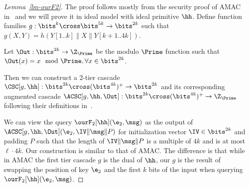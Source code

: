 \begin{proof}[Lemma~\ref{lm-ourF2}]
	The proof follows mostly from the security proof of AMAC in~\cite{EC:BelBerTes16} and we will prove it in ideal model with ideal primitive $\hh$. Define function families $g: \bits^{k} \cross\bits^{5k}\to\bits^{2k}$ such that $g(X,Y) = h(Y[1..k]\| X\|Y[k+1..4k])$.
	
	Let $\Out: \bits^{2k} \to \Z_{\Prime}$ be the modulo $\Prime$ function such that $\Out(x) = x \mod \Prime, \forall x \in \bits^{2k}$.
	
	Then we can construct a  2-tier cascade $\CSC[g, \hh]: \bits^{2k}\cross(\bits^{4k})^{+} \to \bits^{2k}$ and its corresponding augmented cascade $\ACSC[g, \hh, \Out]: \bits^{2k}\cross(\bits^{4k})^{+} \to \Z_\Prime$ following their definitions in~\cite{EC:BelBerTes16}.
	
	
	We can view the query $\ourF_2[\hh](\e_2, \msg)$ as the output of $\ACSC[g, \hh, \Out](\e_2, \IV\|\msg\|P)$ for initialization vector $\IV \in \bits^{2k}$ and padding $P$ such that the length of $\IV\|\msg\|P$ is a multiple of $4k$ and is at most $\ell \cdot 4k$.
	Our construction is similar to that of AMAC.  The difference is that while in AMAC the first tier cascade $g$ is the dual of $\hh$, our $g$ is the result of swapping the position of key $\e_2$ and the first $k$ bits of the input when querying $\ourF_2[\hh](\e_2, \msg)$.
	

\end{proof}
